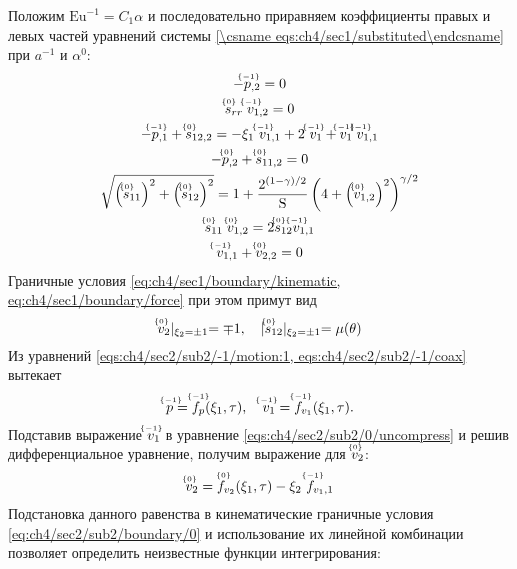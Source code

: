 Положим $\text{Eu}^{-1} = C_1 \alpha$ и последовательно приравняем коэффициенты правых и левых частей уравнений системы \cref{\csname eqs:ch4/sec1/substituted\endcsname} при $a^{-1}$ и $\alpha^0$:
\begin{gather}
  \label{eqs:ch4/sec2/sub2/-1/motion:1}
  -\uindex{p}{-1}_{,2} = 0
  \\
  \label{eqs:ch4/sec2/sub2/-1/coax}
  \uindex{s}{0}_{rr} \; \uindex{v}{-1}_{1,2} = 0
  \\
  \label{eqs:ch4/sec2/sub2/0/motion:1}
  -\uindex{p}{-1}_{,1} + \uindex{s}{0}_{12,2} = -\xi_1 \ \uindex{v}{-1}_{1,1} + 2 \ \uindex{v}{-1}_{1} + \uindex{v}{-1}_{1} \; \uindex{v}{-1}_{1,1}
  \\
  \label{eqs:ch4/sec2/sub2/0/motion:2}
  -\uindex{p}{0}_{,2} + \uindex{s}{0}_{11,2} = 0
  \\
  \label{eqs:ch4/sec2/sub2/0/plasticity}
  \sqrt{\left(\uindex{s}{0}_{11}\right)^2 + \left(\uindex{s}{0}_{12}\right)^2} = 1 + \frac{2^{(1-\gamma)/2}}{\text{S}} \left(4+\left(\uindex{v}{0}_{1,2}\right)^2\right)^{\gamma/2}
  \\
  \label{eqs:ch4/sec2/sub2/0/coax}
  \uindex{s}{0}_{11} \; \uindex{v}{0}_{1,2} = 2 \uindex{s}{0}_{12} \uindex{v}{-1}_{1,1}
  \\
  \label{eqs:ch4/sec2/sub2/0/uncompress}
  \uindex{v}{-1}_{1,1} + \uindex{v}{0}_{2,2} = 0
\end{gather}
Граничные условия \cref{eq:ch4/sec1/boundary/kinematic, eq:ch4/sec1/boundary/force} при этом примут вид
\begin{equation}
  \label{eq:ch4/sec2/sub2/boundary/0}
  \uindex{v}{0}_{2}\lvert_{\xi_2=\pm 1} = \mp 1, \quad \lvert \uindex{s}{0}_{12}\lvert_{\xi_2=\pm 1} = \mu(\theta)
\end{equation}
Из уравнений \cref{eqs:ch4/sec2/sub2/-1/motion:1, eqs:ch4/sec2/sub2/-1/coax} вытекает
\begin{equation*}
  \uindex{p}{-1} = \uindex{f}{-1}_{p}(\xi_1, \tau), \quad \uindex{v}{-1}_{1} = \uindex{f}{-1}_{v_{1}}(\xi_1, \tau).
\end{equation*}
Подставив выражение $\uindex{v}{-1}_{1}$ в уравнение \cref{eqs:ch4/sec2/sub2/0/uncompress} и решив дифференциальное уравнение, получим выражение для $\uindex{v}{0}_{2}$:
\begin{equation*}
  \uindex{v}{0}_{2} = \uindex{f}{0}_{v_{2}}(\xi_1, \tau) - \xi_2 \ \uindex{f}{-1}_{v_{1},1}
\end{equation*}
Подстановка данного равенства в кинематические граничные условия \cref{eq:ch4/sec2/sub2/boundary/0} и использование их линейной комбинации позволяет определить неизвестные функции интегрирования:
